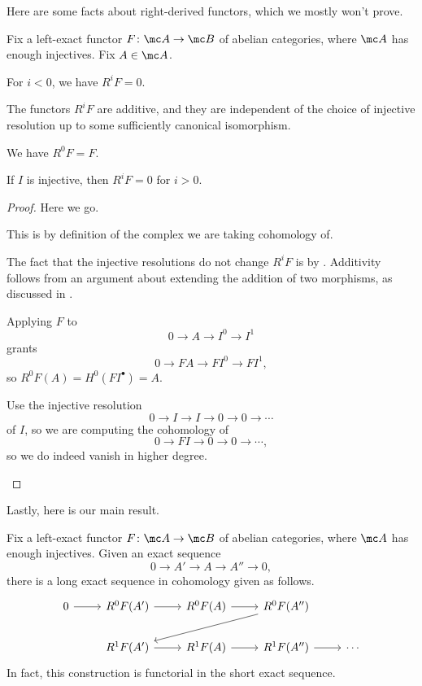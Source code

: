 \documentclass[../notes.tex]{subfiles}
\begin{document}
Here are some facts about right-derived functors, which we mostly won't prove.
\begin{proposition}
	Fix a left-exact functor $F\colon\mc A\to\mc B$ of abelian categories, where $\mc A$ has enough injectives. Fix $A\in\mc A$.
	\begin{listalph}
		\item For $i<0$, we have $R^iF=0$.
		\item The functors $R^iF$ are additive, and they are independent of the choice of injective resolution up to some sufficiently canonical isomorphism.
		\item We have $R^0F=F$.
		\item If $I$ is injective, then $R^iF=0$ for $i>0$.
	\end{listalph}
\end{proposition}
\begin{proof}
	Here we go.
	\begin{listalph}
		\item This is by definition of the complex we are taking cohomology of.
		\item The fact that the injective resolutions do not change $R^iF$ is by . Additivity follows from an argument about extending the addition of two morphisms, as discussed in .
		\item Applying $F$ to
		\[0\to A\to I^0\to I^1\]
		grants
		\[0\to FA\to FI^0\to FI^1,\]
		so $R^0F(A)=H^0(FI^\bullet)=A$.
		\item Use the injective resolution
		\[0\to I\to I\to0\to0\to\cdots\]
		of $I$, so we are computing the cohomology of
		\[0\to FI\to0\to0\to\cdots,\]
		so we do indeed vanish in higher degree.
		\qedhere
	\end{listalph}
\end{proof}
Lastly, here is our main result.
\begin{theorem} \label{thm:les}
	Fix a left-exact functor $F\colon\mc A\to\mc B$ of abelian categories, where $\mc A$ has enough injectives. Given an exact sequence
	\[0\to A'\to A\to A''\to0,\]
	there is a long exact sequence in cohomology given as follows.
	\[\begin{tikzcd}
		0 & {R^0F(A')} & {R^0F(A)} & {R^0F(A'')} \\
		& {R^1F(A')} & {R^1F(A)} & {R^1F(A'')} & \cdots
		\arrow[from=1-1, to=1-2]
		\arrow[from=1-2, to=1-3]
		\arrow[from=1-3, to=1-4]
		\arrow[from=1-4, to=2-2]
		\arrow[from=2-2, to=2-3]
		\arrow[from=2-3, to=2-4]
		\arrow[from=2-4, to=2-5]
	\end{tikzcd}\]
	In fact, this construction is functorial in the short exact sequence.
\end{theorem}
\end{document}

